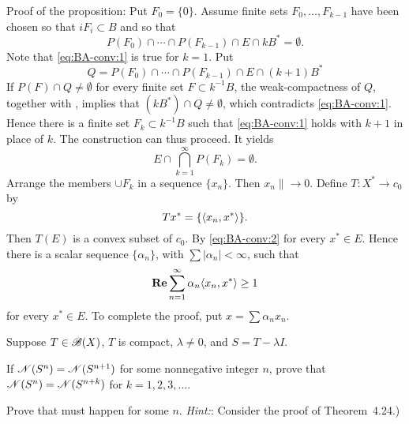 \begin{enumerate}
\begin{excopy}
\begin{itemize}
Proof of the proposition: Put \(F_0 = \{0\}\).
 Assume finite sets \(F_0,\ldots,F_{k-1}\) have been
chosen so that \(iF_i \subset B\) and so that
\begin{equation} \label{eq:BA-conv:1}
P(F_0) \cap \cdots \cap P(F_{k-1}) \cap E \cap kB^* = \emptyset.
\end{equation}
Note that \eqref{eq:BA-conv:1} is true for \(k = 1\). Put
\begin{equation*}
Q = P(F_0) \cap \cdots \cap P(F_{k-1}) \cap E \cap (k+1)B^* 
\end{equation*}
If \(P(F) \cap Q \neq \emptyset\) for every finite set
 \(F \subset k^{-1}B\), the weak\upstar-compactness of $Q$,
together with , implies that \((kB^*) \cap Q \neq \emptyset\),
 which contradicts \eqref{eq:BA-conv:1}. Hence there
is a finite set \(F_k \subset k^{-1}B\) such that \eqref{eq:BA-conv:1} holds
 with \(k+1\) in place of $k$. The construction
can thus proceed. It yields
\begin{equation} \label{eq:BA-conv:2}
E \cap \bigcap_{k=1}^\infty P(F_k) = \emptyset.
\end{equation}
Arrange the members \(\cup F_k\) in a sequence \(\{x_n\}\).
 Then \(x_n\| \to 0\). Define \(T: X^* \to c_0\)
by
\begin{equation*}
Tx^* = \{\langle x_n,x^* \rangle\}.
\end{equation*}
Then \(T(E)\) is a convex subset of \(c_0\). By \eqref{eq:BA-conv:2}
for every \(x^* \in E\). Hence there is a scalar sequence \(\{\alpha_n\}\),
 with \(\sum |\alpha_n| < \infty\), such that
\begin{equation*}
\mathop{\bf Re}\nolimits \sum_{n=1}^\infty \alpha_n \langle x_n,x^* \rangle \geq 1
\end{equation*}
for every \(x^* \in E\). To complete the proof, put \(x = \sum \alpha_n x_n\).

\end{itemize}
\end{excopy}



\unfinished

\begin{excopy}
Suppose \(T \in \mathscr{B}(X)\), $T$ is compact, \(\lambda \neq 0\),
 and \(S = T - \lambda I\).
\begin{itemize}

If \(\mathscr{N}(S^n) = \mathscr{N}(S^{n+1})\) for some  nonnegative integer $n$,
 prove that \(\mathscr{N}(S^n) = \mathscr{N}(S^{n+k})\)
for \(k=1,2,3,\ldots\).

Prove that  must happen for some $n$. 
\emph{Hint:}: Consider the proof of Theorem~4.24.)


\end{itemize}
\end{excopy}
\end{enumerate}
